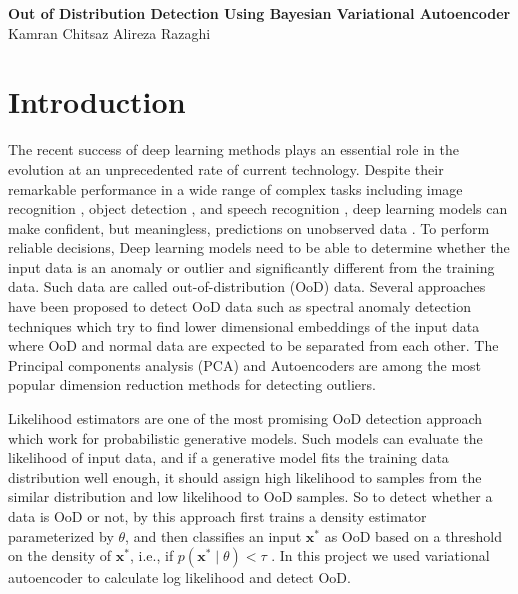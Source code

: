 \documentclass[12pt]{article}
\newcommand\tab[1][3cm]{\hspace*{#1}}
\begin{document}
\begin{center}
{\Large \textbf{Out of Distribution Detection Using Bayesian Variational Autoencoder}} \\[.2in]
{\large Kamran Chitsaz   \tab   Alireza Razaghi}
\end{center}

\vspace*{.05in}


\section{Introduction}

The recent success of deep learning methods plays an essential role in the evolution at an unprecedented rate of current technology. Despite their remarkable performance in a wide range of complex tasks including image recognition \cite{krizhevsky2012imagenet}, object detection \cite{girshick2014rich}, and speech recognition \cite{deng2013recent}, deep learning models can make confident, but meaningless, predictions on unobserved data \cite{nguyen2015deep}. To perform reliable decisions, Deep learning models need to be able to determine whether the input data is an anomaly or outlier and significantly different from the training data. Such data are called out-of-distribution (OoD) data. Several approaches have been proposed to detect OoD data such as spectral anomaly detection techniques which try to find lower dimensional embeddings of the input data where OoD and normal data are expected to be separated from each other. The Principal components analysis (PCA) \cite{chandola2009anomaly} and Autoencoders \cite{sakurada2014anomaly} are among the most popular dimension reduction methods for detecting outliers.


Likelihood estimators are one of the most promising OoD detection approach which work for probabilistic generative models. Such models can evaluate the likelihood of input data, and if a generative model fits the training data distribution well enough, it should assign high likelihood to samples from the similar distribution and low likelihood to OoD samples. So to detect whether a data is OoD or not, by this approach first trains a density estimator parameterized by $\theta$, and then classifies an input $\mathbf{x}^{*}$ as OoD based on a threshold on the density of $\mathbf{x}^{*}$, i.e., if $p\left(\mathbf{x}^{*} \mid \theta\right)<\tau$ \cite{bishop1994novelty}. In this project we used variational autoencoder to calculate log likelihood and detect OoD.
\end{document}
